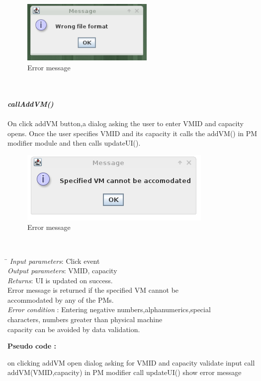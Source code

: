 ﻿\documentclass[a4paper,11pt]{article}
\begin{document}
\begin{figure}[h]
 \centering
 \includegraphics[height=3cm]{7.png}
 \caption{Error message}
\end{figure}
\pagebreak
\mbox{}\\\\
\emph{\bf callAddVM()}\\\\
 On click addVM button,a dialog asking the user to enter VM\textunderscore ID and  capacity opens.
  Once the user specifies VM\textunderscore ID and its capacity it calls the addVM() in PM modifier module and then calls updateUI().
  \\
  \begin{figure}[ht!]
 \centering
 \includegraphics[scale=0.5, angle=0]{8.png}
 \caption{Error message}
\end{figure}
\pagebreak
\\
  \begin{tabbing}
  \hspace*{4cm}\= \kill
  \emph{Input parameters}\>: Click event\\
\emph{Output parameters}\>: VM\textunderscore ID, capacity\\
\emph{Returns}\>: UI is updated on success. \\ \> Error message is returned if the specified VM cannot be \\ \> accommodated by any of the PMs.\\
\emph{Error condition} \>: Entering negative numbers,alphanumerics,special \\ \> characters, numbers greater than  physical machine \\ \>capacity can be avoided by data validation.
 \\
 \end{tabbing}
  \textbf{Pseudo code :}
 \begin{algorithmic}[1]
\STATE on clicking addVM
\STATE open dialog asking for VM\textunderscore ID and capacity
\STATE validate input
\STATE call addVM(VM\textunderscore ID,capacity) in PM modifier
\STATE call updateUI()
\ELSE 
\STATE show error message
\ENDIF
 \end{algorithmic}
\end{document}
